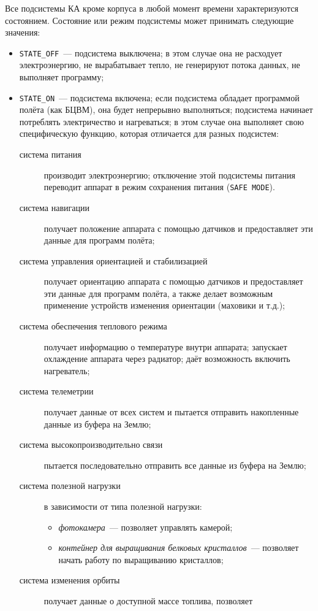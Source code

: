 \documentclass[12pt,a4paper]{article}
\begin{document}
Все подсистемы КА кроме корпуса в любой момент времени характеризуются
состоянием. Состояние или режим подсистемы может принимать следующие значения:

\begin{itemize}
\item \verb'STATE_OFF'~--- подсистема выключена; в этом случае она не расходует
  электроэнергию, не вырабатывает тепло, не генерируют потока данных, не выполняет
  программу;
\item \verb'STATE_ON'~--- подсистема включена; если подсистема обладает программой полёта
  (как БЦВМ), она будет непрерывно выполняться; подсистема начинает потреблять
  электричество и нагреваться; в этом случае она выполняет свою специфическую функцию,
  которая отличается для разных подсистем:
  \begin{description}
  \item[система питания] производит электроэнергию; отключение этой подсистемы питания
    переводит аппарат в режим сохранения питания (\verb'SAFE MODE').
  \item[система навигации] получает положение аппарата с помощью датчиков и предоставляет
    эти данные для программ полёта;
  \item[система управления ориентацией и стабилизацией] получает ориентацию аппарата с
    помощью датчиков и предоставляет эти данные для программ полёта, а также делает
    возможным применение устройств изменения ориентации (маховики и т.д.);
  \item[система обеспечения теплового режима] получает информацию о температуре внутри
    аппарата; запускает охлаждение аппарата через радиатор; даёт возможность включить
    нагреватель;
  \item[система телеметрии] получает данные от всех систем и пытается отправить
    накопленные данные из буфера на Землю;
  \item[система высокопроизводительно связи] пытается последовательно отправить все данные
    из буфера на Землю;
  \item[система полезной нагрузки] в зависимости от типа полезной нагрузки:
    \begin{itemize}
      \item \emph{фотокамера}~--- позволяет управлять камерой;  
      \item \emph{контейнер для выращивания белковых кристаллов}~--- позволяет начать работу по
        выращиванию кристаллов;
    \end{itemize}
  \item[система изменения орбиты] получает данные о доступной массе топлива, позволяет

\end{description}
\end{itemize}
\end{document}
